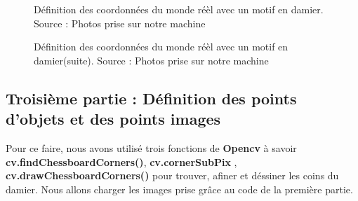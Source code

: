  	 \begin{figure}[H]%
 	 	\center%
 	 	\setlength{\fboxsep}{5pt}%
 	 	\setlength{\fboxrule}{0.5pt}%
 	 	\caption[Définition des coordonnées du monde réèl]{Définition des coordonnées du monde réèl avec un motif en damier. Source : Photos prise sur notre machine}
 	 	\label{fig:Définition des coordonnées du monde réèl}
 	 	 \end{figure}
 	 	 \begin{figure}[H]%
 	 		\center%
 	 		\setlength{\fboxsep}{5pt}%
 	 		\setlength{\fboxrule}{0.5pt}%
 	 		\caption[Définition des coordonnées du monde réèl(suite)]{Définition des coordonnées du monde réèl avec un motif en damier(suite). Source : Photos prise sur notre machine}
 	 		\label{fig:Définition des coordonnées du monde réèl(suite)}
 	 		 \end{figure}
 	 
 	
 	\subsection{Troisième partie : Définition des points d'objets et des points images}
 	 
 	Pour ce faire, nous avons utilisé trois fonctions de \textbf{Opencv} à savoir \textbf{cv.findChessboardCorners()}, \textbf{cv.cornerSubPix} , \textbf{cv.drawChessboardCorners()} pour trouver, afiner et déssiner les coins du damier. Nous allons charger les images prise grâce au code de la première partie. 
 	
